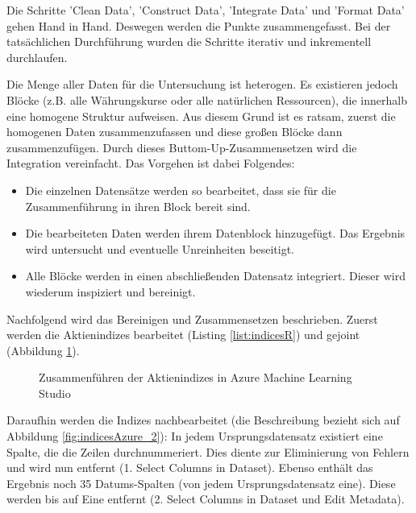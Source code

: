 Die Schritte 'Clean Data', 'Construct Data', 'Integrate Data' und 'Format Data' gehen Hand in Hand. Deswegen werden die Punkte zusammengefasst. Bei der tatsächlichen Durchführung wurden die Schritte iterativ und inkrementell durchlaufen. \par
Die Menge aller Daten für die Untersuchung ist heterogen. Es existieren jedoch Blöcke (z.B. alle Währungskurse oder alle natürlichen Ressourcen), die innerhalb eine homogene Struktur aufweisen. Aus diesem Grund ist es ratsam, zuerst die homogenen Daten zusammenzufassen und diese großen Blöcke dann zusammenzufügen. Durch dieses Buttom-Up-Zusammensetzen wird die Integration vereinfacht.
Das Vorgehen ist dabei Folgendes:
\begin{itemize}
\item Die einzelnen Datensätze werden so bearbeitet, dass sie für die Zusammenführung in ihren Block bereit sind.
\item Die bearbeiteten Daten werden ihrem Datenblock hinzugefügt. Das Ergebnis wird untersucht und eventuelle Unreinheiten beseitigt.
\item Alle Blöcke werden in einen abschließenden Datensatz integriert. Dieser wird wiederum inspiziert und bereinigt.
\end{itemize}
Nachfolgend wird das Bereinigen und Zusammensetzen beschrieben. Zuerst werden die Aktienindizes bearbeitet (Listing \ref{list:indicesR}) und gejoint (Abbildung \ref{fig:indicesAzure_1}). 

\begin{figure}[H]
\centering
{}
\caption{Zusammenführen der Aktienindizes in Azure Machine Learning Studio}
\label{fig:indicesAzure_1}
\end{figure}
Daraufhin werden die Indizes nachbearbeitet (die Beschreibung bezieht sich auf Abbildung \ref{fig:indicesAzure_2}): In jedem Ursprungsdatensatz existiert eine Spalte, die die Zeilen durchnummeriert. Dies diente zur Eliminierung von Fehlern und wird nun entfernt (1. Select Columns in Dataset). Ebenso enthält das Ergebnis noch 35 Datums-Spalten (von jedem Ursprungsdatensatz eine). Diese werden bis auf Eine entfernt (2. Select Columns in Dataset und Edit Metadata).
